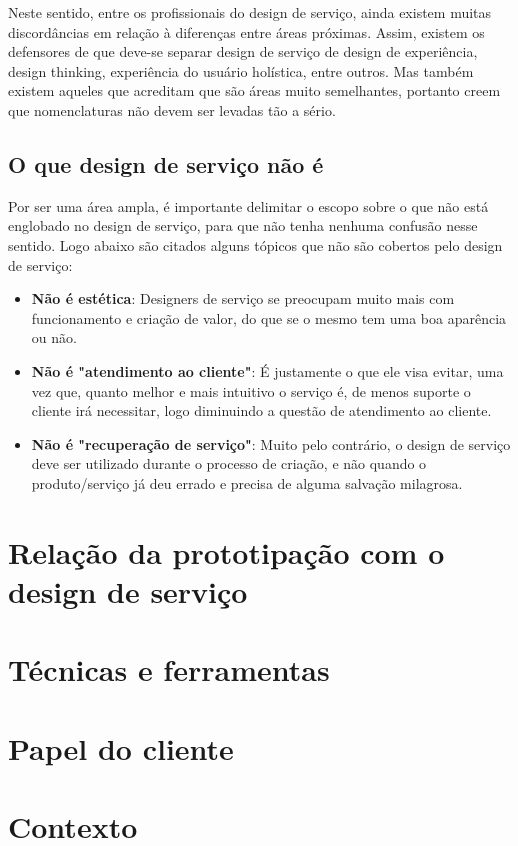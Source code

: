 Neste sentido, entre os profissionais do design de serviço, ainda existem muitas discordâncias em relação à diferenças entre áreas próximas. Assim, existem os defensores de que deve-se separar design de serviço de design de experiência, design thinking, experiência do usuário holística, entre outros. Mas também existem aqueles que acreditam que são áreas muito semelhantes, portanto creem que nomenclaturas não devem ser levadas tão a sério.

\subsection{O que design de serviço não é}

Por ser uma área ampla, é importante delimitar o escopo sobre o que não está englobado no design de serviço, para que não tenha nenhuma confusão nesse sentido. Logo abaixo são citados alguns tópicos que não são cobertos pelo design de serviço:

\begin{itemize}
	\item \textbf{Não é estética}: Designers de serviço se preocupam muito mais com funcionamento e criação de valor, do que se o mesmo tem uma boa aparência ou não.
	
	\item \textbf{Não é "atendimento ao cliente"}: É justamente o que ele visa evitar, uma vez que, quanto melhor e mais intuitivo o serviço é, de menos suporte o cliente irá necessitar, logo diminuindo a questão de atendimento ao cliente.
	
	\item \textbf{Não é "recuperação de serviço"}: Muito pelo contrário, o design de serviço deve ser utilizado durante o processo de criação, e não quando o produto/serviço já deu errado e precisa de alguma salvação milagrosa.
\end{itemize}

\section{Relação da prototipação com o design de serviço}


\section{Técnicas e ferramentas}

\section{Papel do cliente}

\section{Contexto}
